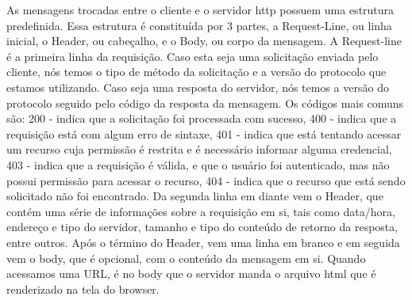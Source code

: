 As mensagens trocadas entre o cliente e o servidor http possuem uma estrutura predefinida. Essa estrutura é constituída por 3 partes, a Request-Line, ou linha inicial, o Header, ou cabeçalho, e o Body, ou corpo da mensagem. 
A Request-line é a primeira linha da requisição. Caso esta seja uma solicitação enviada pelo cliente, nós temos o tipo de método da solicitação e a versão do protocolo que estamos utilizando. Caso seja uma resposta do servidor, nós temos a versão do protocolo seguido pelo código da resposta da mensagem. Os códigos mais comuns são: 200 - indica que a solicitação foi processada com sucesso, 400 - indica que a requisição está com algum erro de sintaxe, 401 - indica que está tentando acessar um recurso cuja permissão é restrita e é necessário informar alguma credencial, 403 - indica que a requisição é válida, e que o usuário foi autenticado, mas não possui permissão para acessar o recurso, 404 - indica que o recurso que está sendo solicitado não foi encontrado. 
Da segunda linha em diante vem o Header, que contém uma série de informações sobre a requisição em si, tais como data/hora, endereço e tipo do servidor, tamanho e tipo do conteúdo de retorno da resposta, entre outros.
Após o término do Header, vem uma linha em branco e em seguida vem o body, que é opcional, com o conteúdo da mensagem em si. Quando acessamos uma URL, é no body que o servidor manda o arquivo html que é renderizado na tela do browser.

